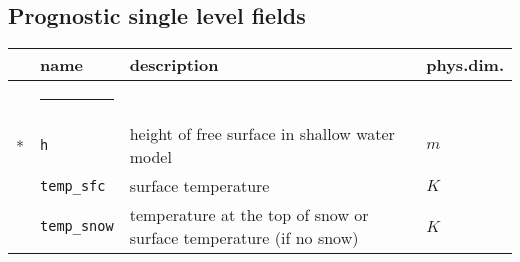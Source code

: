 \subsection{Prognostic single level fields}
\begin{tabular}{l l l l}  
& \parbox{.15\textwidth}{name} & \parbox{.65\textwidth}{description} & 
\parbox{.1\textwidth}{phys.dim.} \\ \hline  
& \rule{4ex}{0pt} & \\[-10pt]  
* & \texttt{h}   & height of free surface in shallow water model & $m$ \\  
 & \texttt{temp\_sfc}   & surface temperature & $K$ \\  
 & \texttt{temp\_snow}   & temperature at the top of snow or surface 
temperature (if no snow) & $K$ \\[5pt]  
\end{tabular}  
